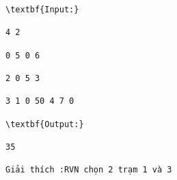 \begin{verbatim}
\textbf{Input:}

4 2

0 5 0 6

2 0 5 3

3 1 0 50 4 7 0

\textbf{Output:}

35

Giải thích :RVN chọn 2 trạm 1 và 3\end{verbatim}